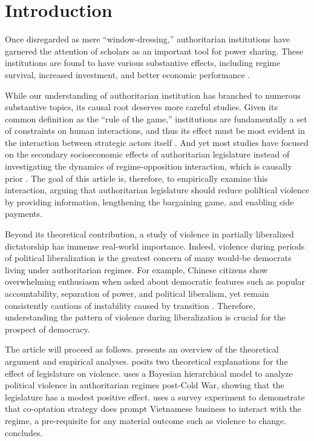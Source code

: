 \section{Introduction}
\label{sec:introduction}

Once disregarded as mere ``window-dressing,'' authoritarian institutions have garnered the attention of scholars as an important tool for power sharing. These institutions are found to have various substantive effects, including regime survival, increased investment, and better economic performance \citep{Gandhi2008, Wright2008, Boix2013, Jensen2012}.

While our understanding of authoritarian institution has branched to numerous substantive topics, its causal root deserves more careful studies. Given its common definition as the ``rule of the game,'' institutions are fundamentally a set of constraints on human interactions, and thus its effect must be most evident in the interaction between strategic actors itself \citep{North1990}. And yet most studies have focused on the secondary socioeconomic effects of authoritarian legislature instead of investigating the dynamics of regime-opposition interaction, which is causally prior \citep{Gandhi2007, Svolik2012}. The goal of this article is, therefore, to empirically examine this interaction, arguing that authoritarian legislature should reduce poliltical violence by providing information, lengthening the bargaining game, and enabling side payments.

Beyond its theoretical contribution, a study of violence in partially liberalized dictatorship has immense real-world importance. Indeed, violence during periods of political liberalization is the greatest concern of many would-be democrats living under authoritarian regimes. For example, Chinese citizens show overwhelming enthusiasm when asked about democratic features such as popular accountability, separation of power, and political liberalism, yet remain consistently cautious of instability caused by transition \citep[309]{Chu2008}. Therefore, understanding the pattern of violence during liberalization is crucial for the prospect of democracy.

The article will proceed as follows.  presents an overview of the theoretical argument and empirical analyses.  posits two theoretical explanations for the effect of legislature on violence.  uses a Bayesian hierarchical model to analyze political violence in authoritarian regimes post-Cold War, showing that the legislature has a modest positive effect.  uses a survey experiment to demonstrate that co-optation strategy does prompt Vietnamese business to interact with the regime, a pre-requisite for any material outcome such as violence to change.  concludes.